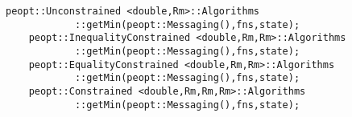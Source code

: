 \begin{lstlisting}[style=C++]
    peopt::Unconstrained <double,Rm>::Algorithms
            ::getMin(peopt::Messaging(),fns,state);
    peopt::InequalityConstrained <double,Rm,Rm>::Algorithms
            ::getMin(peopt::Messaging(),fns,state);
    peopt::EqualityConstrained <double,Rm,Rm>::Algorithms
            ::getMin(peopt::Messaging(),fns,state);
    peopt::Constrained <double,Rm,Rm,Rm>::Algorithms
            ::getMin(peopt::Messaging(),fns,state);
\end{lstlisting}
